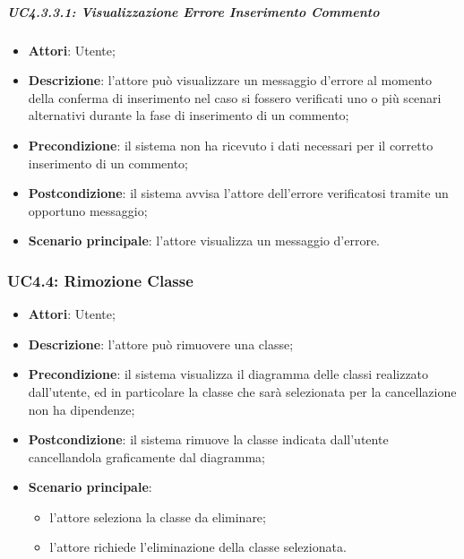 \subparagraph{UC4.3.3.1: Visualizzazione Errore Inserimento Commento}
\label{UC4.3.3.1}
\begin{itemize}
\item \textbf{Attori}: Utente;
\item \textbf{Descrizione}: l'attore può visualizzare un messaggio d'errore al momento della conferma di inserimento nel caso si fossero verificati uno o più scenari alternativi durante la fase di inserimento di un commento;	
\item \textbf{Precondizione}: il sistema non ha ricevuto i dati necessari per il corretto inserimento di un commento;	
\item \textbf{Postcondizione}: il sistema avvisa l'attore dell'errore verificatosi tramite un opportuno messaggio;	
\item \textbf{Scenario principale}:
l'attore visualizza un messaggio d'errore.	
\end{itemize}

\subsubsection{UC4.4: Rimozione Classe}
\label{UC4.4}
\begin{itemize}
\item \textbf{Attori}: Utente;
\item \textbf{Descrizione}: l'attore può rimuovere una classe;
\item \textbf{Precondizione}: il sistema visualizza il diagramma delle classi realizzato dall'utente, ed in particolare la classe che sarà selezionata per la cancellazione non ha dipendenze;
\item \textbf{Postcondizione}: il sistema rimuove la classe indicata dall'utente cancellandola graficamente dal diagramma;
\item \textbf{Scenario principale}:
\begin{itemize}
	\item l'attore seleziona la classe da eliminare;
	\item l'attore richiede l'eliminazione della classe selezionata.
\end{itemize}
\end{itemize}

